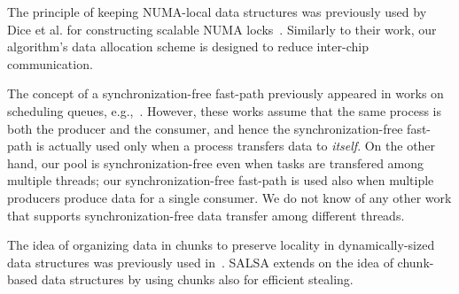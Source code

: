 The principle of keeping NUMA-local data structures was previously used 
by Dice et al. for constructing scalable NUMA locks~\cite{Dice:2011:FNL:1989493.1989502}. 
Similarly to their work, our algorithm's data allocation scheme is designed to reduce inter-chip communication. 

The concept of a synchronization-free fast-path previously
appeared in works on scheduling queues,
e.g.,~\cite{Arora:1998:TSM:277651.277678,Hendler:2006:DNW:1160290.1160294}. However, these works
assume that the same process is both the producer and the consumer, and hence the
synchronization-free fast-path is actually used only when a process transfers data to \emph{itself}.
On the other hand, our pool is synchronization-free even when tasks are transfered among multiple
threads; our synchronization-free fast-path is used also when multiple producers produce data for
a single consumer. We do not know of any other work that supports synchronization-free data
transfer among different threads.


The idea of organizing data in chunks to preserve locality in dynamically-sized data
structures was previously used
in~\cite{Braginsky:2011:LLL:1946143.1946153, Gidenstam:2010:CLQ:1940234.1940266,
Hendler:2006:DNW:1160290.1160294, Sundell:2011:LAC:1989493.1989550}. SALSA extends on the idea of
chunk-based data structures by using chunks also for efficient stealing.